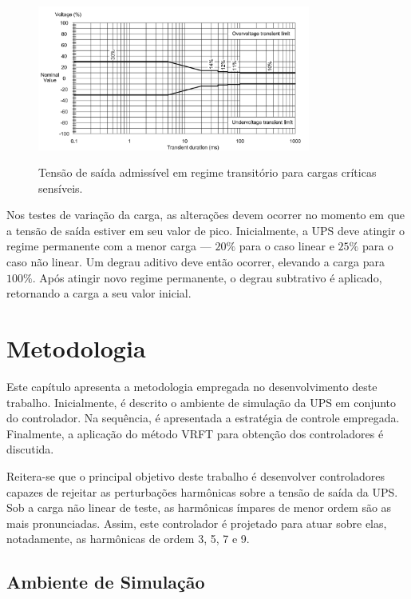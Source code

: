 \documentclass[repeatfields,oneside]{tcc}
\begin{document}
\begin{figure}[h]
    \centering
    \caption{Tensão de saída admissível em regime transitório para cargas críticas sensíveis.}
    \includegraphics[trim={0 0 0 10}, clip, width=0.8\textwidth]{fig/DynamicVoltage1}
    \label{fig:IEC_DynamicVoltage1}
    \\
\end{figure}

Nos testes de variação da carga, as alterações devem ocorrer no momento em que a tensão de saída estiver em seu valor de pico.
Inicialmente, a UPS deve atingir o regime permanente com a menor carga --- $20 \%$ para o caso linear e $25 \%$ para o caso não linear.
Um degrau aditivo deve então ocorrer, elevando a carga para $100 \%$.
Após atingir novo regime permanente, o degrau subtrativo é aplicado, retornando a carga a seu valor inicial.


\chapter{Metodologia}\label{sec:metodologia}

Este capítulo apresenta a metodologia empregada no desenvolvimento deste trabalho.
Inicialmente, é descrito o ambiente de simulação da UPS em conjunto do controlador.
Na sequência, é apresentada a estratégia de controle empregada.
Finalmente, a aplicação do método VRFT para obtenção dos controladores é discutida.

Reitera-se que o principal objetivo deste trabalho é desenvolver controladores capazes de rejeitar as perturbações harmônicas sobre a tensão de saída da UPS.
Sob a carga não linear de teste, as harmônicas ímpares de menor ordem são as mais pronunciadas.
Assim, este controlador é projetado para atuar sobre elas, notadamente, as harmônicas de ordem 3, 5, 7 e 9.

\section{Ambiente de Simulação}
\end{document}
